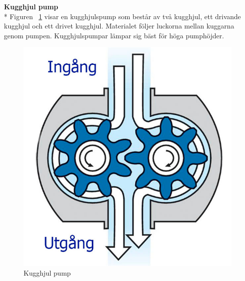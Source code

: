 \newpage
\textbf{Kugghjul pump}\\*
Figuren ~\ref{kugghjulpump} visar en kugghjulspump som består av två kugghjul, ett drivande kugghjul och ett drivet kugghjul.  Materialet följer luckorna mellan kuggarna genom pumpen. Kugghjulspumpar lämpar sig bäst för höga pumphöjder\cite{kugghjul pump}.

\begin{figure}[h]
	\begin{center}
		\includegraphics[scale=0.25]{images/68637(1).jpg}
		\caption{Kugghjul pump}
		\label{kugghjulpump}	
	\end{center}
\end{figure}